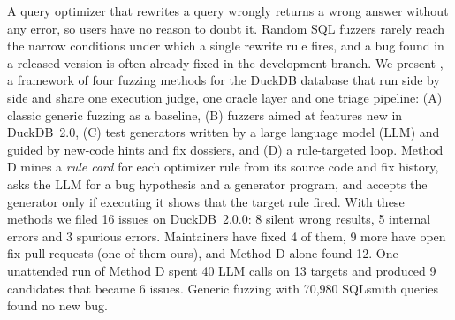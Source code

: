 A query optimizer that rewrites a query wrongly returns a wrong answer without any error, so users have no reason to
doubt it. Random SQL fuzzers rarely reach the narrow conditions under which a single rewrite rule fires, and a bug
found in a released version is often already fixed in the development branch. We present \tool, a framework of four
fuzzing methods for the DuckDB database that run side by side and share one execution judge, one oracle layer and one
triage pipeline: (A) classic generic fuzzing as a baseline, (B) fuzzers aimed at features new in DuckDB~2.0, (C) test
generators written by a large language model (LLM) and guided by new-code hints and fix dossiers, and (D) a
rule-targeted loop. Method D mines a \emph{rule card} for each optimizer rule from its source code and fix history,
asks the LLM for a bug hypothesis and a generator program, and accepts the generator only if executing it shows that
the target rule fired. With these methods we filed 16 issues on DuckDB~2.0.0: 8 silent wrong results, 5 internal
errors and 3 spurious errors. Maintainers have fixed 4 of them, 9 more have open fix pull requests (one of them ours),
and Method D alone found 12. One unattended run of Method D spent 40 LLM calls on 13 targets and produced 9 candidates
that became 6 issues. Generic fuzzing with 70{,}980 SQLsmith queries found no new bug.
